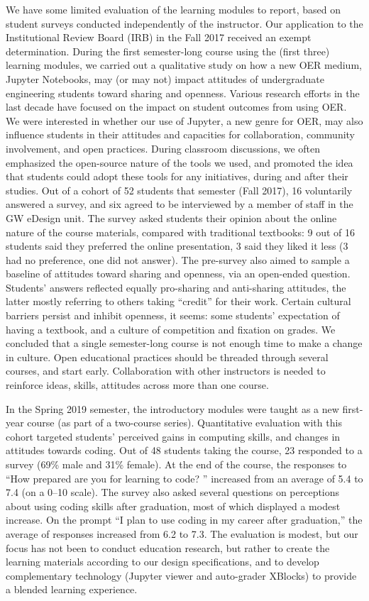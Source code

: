 \documentclass[10pt,journal,compsoc]{IEEEtran}
\begin{document}
We have some limited evaluation of the learning modules to report, based on student surveys conducted independently of the instructor. 
Our application to the Institutional Review Board (IRB) in the Fall 2017 received an exempt determination.
During the first semester-long course using the (first three) learning modules, we carried out a qualitative study on how a new OER medium, Jupyter Notebooks, may (or may not) impact attitudes of undergraduate engineering students toward sharing and openness. 
Various research efforts in the last decade have focused on the impact on student outcomes from using OER. 
We were interested in whether our use of Jupyter, a new genre for OER, may also influence students in their attitudes and capacities for collaboration, community involvement, and open practices. 
During classroom discussions, we often emphasized the open-source nature of the tools we used, and promoted the idea that students could adopt these tools for any initiatives, during and after their studies. 
Out of a cohort of 52 students that semester (Fall 2017), 16 voluntarily answered a survey, and six agreed to be interviewed by a member of staff in the GW eDesign unit. 
The survey asked students their opinion about the online nature of the course materials, compared with traditional textbooks: 9 out of 16 students said they preferred the online presentation, 3 said they liked it less (3 had no preference, one did not answer). 
The pre-survey also aimed to sample a baseline of attitudes toward sharing and openness, via an open-ended question. 
Students' answers reflected equally pro-sharing and anti-sharing attitudes, the latter mostly referring to others taking ``credit'' for their work. 
Certain cultural barriers persist and inhibit openness, it seems: some students' expectation of having a textbook, and a culture of competition and fixation on grades. 
We concluded that a single semester-long course is not enough time to make a change in culture. 
Open educational practices should be threaded through several courses, and start early. 
Collaboration with other instructors is needed to reinforce ideas, skills, attitudes across more than one course.

In the Spring 2019 semester, the introductory modules were taught as a new first-year course (as part of a two-course series).
Quantitative evaluation with this cohort targeted students' perceived gains in computing skills, and changes in attitudes towards coding. 
Out of 48 students taking the course, 23 responded to a survey (69\% male and 31\% female). 
At the end of the course, the responses to ``How prepared are you for learning to code? '' increased from an average of 5.4 to 7.4 (on a 0--10 scale). 
The survey also asked several questions on perceptions about using coding skills after graduation, most of which displayed a modest increase. 
On the prompt ``I plan to use coding in my career after graduation,'' the average of responses increased from 6.2 to 7.3. 
The evaluation is modest, but our focus has not been to conduct education research, but rather to create the learning materials according to our design specifications, and to develop complementary technology (Jupyter viewer and auto-grader XBlocks) to provide a blended learning experience.
\end{document}
